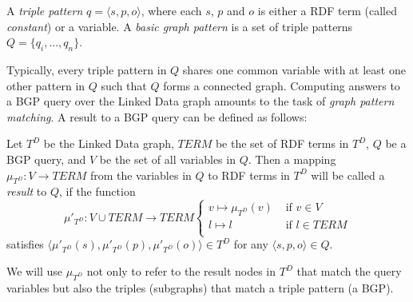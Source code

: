 \begin{definition}
  A \emph{triple pattern} $q=\langle s,p,o \rangle$, where each $s$,
  $p$ and $o$ is either a RDF term (called \emph{constant}) or a
  variable. A \emph{basic graph pattern} is a set of triple patterns
  $Q= \{q_i,\ldots,q_n\}$.
\end{definition}

Typically, every triple pattern in $Q$ shares one common variable with
at least one other pattern in $Q$ such that $Q$ forms a connected
graph. Computing answers to a BGP query over the Linked Data graph
amounts to the task of \emph{graph pattern matching}. A result to a
BGP query can be defined as follows:

\begin{definition}[Result]
  Let $T^D$ be the Linked Data graph, $TERM$ be the set of RDF terms
  in $T^D$, $Q$ be a BGP query, and $V$ be the set of all variables in
  $Q$. Then a mapping $\mu_{T^D}: V \to TERM$ from the variables in
  $Q$ to RDF terms in $T^D$ will be called a \emph{result} to $Q$, if
  the function
  \[
  \mu'_{T^D}: V \cup TERM \to TERM \left\{
    \begin{array}{ll}
      v \mapsto \mu_{T^D}(v) & \mbox{ if } v\in V \\
      l \mapsto l & \mbox{ if } l \in TERM\\
    \end{array}\right.
  \]
satisfies $\langle \mu'_{T^D}(s),\mu'_{T^D}(p), \mu'_{T^D}(o) \rangle
\in T^D$ for any $\langle s,p,o \rangle \in Q$.
\end{definition}

We will use $\mu_{T^D}$ not only to refer to
the result nodes in ${T^D}$ that match the query variables but also the
triples (subgraphs) that match a triple pattern (a BGP).

